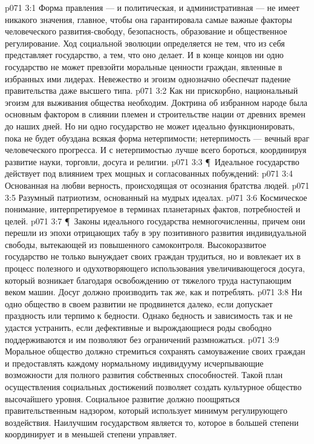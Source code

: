 \vs p071 3:1 Форма правления --- и политическая, и административная --- не имеет никакого значения, главное, чтобы она гарантировала самые важные факторы человеческого развития\hyp{}свободу, безопасность, образование и общественное регулирование. Ход социальной эволюции определяется не тем, что из себя представляет государство, а тем, что оно делает. И в конце концов ни одно государство не может превзойти моральные ценности граждан, явленные в избранных ими лидерах. Невежество и эгоизм однозначно обеспечат падение правительства даже высшего типа.
\vs p071 3:2 Как ни прискорбно, национальный эгоизм для выживания общества необходим. Доктрина об избранном народе была основным фактором в слиянии племен и строительстве нации от древних времен до наших дней. Но ни одно государство не может идеально функционировать, пока не будет обуздана всякая форма нетерпимости; нетерпимость --- вечный враг человеческого прогресса. И с нетерпимостью лучше всего бороться, координируя развитие науки, торговли, досуга и религии.
\vs p071 3:3 \P\ Идеальное государство действует под влиянием трех мощных и согласованных побуждений:
\vs p071 3:4 \bibnobreakspace Основанная на любви верность, происходящая от осознания братства людей.
\vs p071 3:5 \bibnobreakspace Разумный патриотизм, основанный на мудрых идеалах.
\vs p071 3:6 \bibnobreakspace Космическое понимание, интерпретируемое в терминах планетарных фактов, потребностей и целей.
\vs p071 3:7 \P\ Законы идеального государства немногочисленны, причем они перешли из эпохи отрицающих табу в эру позитивного развития индивидуальной свободы, вытекающей из повышенного самоконтроля. Высокоразвитое государство не только вынуждает своих граждан трудиться, но и вовлекает их в процесс полезного и одухотворяющего использования увеличивающегося досуга, который возникает благодаря освобождению от тяжелого труда наступающим веком машин. Досуг должно производить так же, как и потреблять.
\vs p071 3:8 Ни одно общество в своем развитии не продвинется далеко, если допускает праздность или терпимо к бедности. Однако бедность и зависимость так и не удастся устранить, если дефективные и вырождающиеся роды свободно поддерживаются и им позволяют без ограничений размножаться.
\vs p071 3:9 Моральное общество должно стремиться сохранять самоуважение своих граждан и предоставлять каждому нормальному индивидууму исчерпывающие возможности для полного развития собственных способностей. Такой план осуществления социальных достижений позволяет создать культурное общество высочайшего уровня. Социальное развитие должно поощряться правительственным надзором, который использует минимум регулирующего воздействия. Наилучшим государством является то, которое в большей степени координирует и в меньшей степени управляет.
